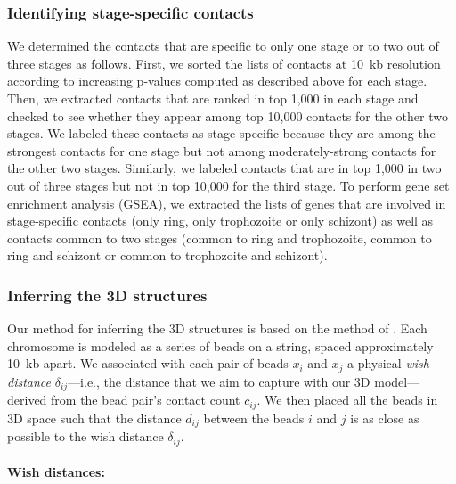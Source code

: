 \subsubsection*{Identifying stage-specific contacts}
\label{met:spageSpecific}
We determined the contacts that are specific to only one stage or to two out of three stages
as follows. First, we sorted the lists of contacts at 10~kb resolution according to increasing
p-values computed as described above for each stage. Then, we extracted contacts that are
ranked in top 1,000 in each stage and checked to see whether they appear among top 10,000
contacts for the other two stages. We labeled these contacts as stage-specific because they
are among the strongest contacts for one stage but not among moderately-strong contacts for
the other two stages. Similarly, we labeled contacts that are in top 1,000 in two out of
three stages but not in top 10,000 for the third stage. To perform gene set enrichment
analysis (GSEA), we extracted the lists of genes that are involved in stage-specific contacts
(only ring, only trophozoite or only schizont) as well as contacts common to two stages
(common to ring and trophozoite, common to ring and schizont or common to trophozoite and schizont).


\subsubsection*{Inferring the 3D structures}
\label{met:inferring}
Our method for inferring the 3D structures is based on the method of \cite{duan:three}.
Each chromosome is modeled as a series of beads on a string, spaced approximately
10~kb apart. We associated with each pair of beads $x_i$ and $x_j$ a physical
{\em wish distance} $\delta_{ij}$---i.e., the distance that we aim to capture with
our 3D model---derived from the bead pair's contact count $c_{ij}$. We then
placed all the beads in 3D space such that the distance $d_{ij}$ between the beads
$i$ and $j$ is as close as possible to the wish distance $\delta_{ij}$.

\paragraph{Wish distances: }


